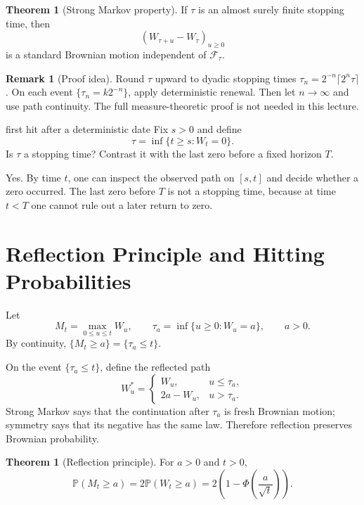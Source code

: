 \documentclass[10pt]{article}
\newcommand{\Pbb}{\mathbb P}
\newcommand{\1}{\mathbf 1}
\newcommand{\cF}{\mathcal F}
\theoremstyle{definition}
\newtheorem{theorem}[definition]{Theorem}
\newtheorem{remark}[definition]{Remark}
\begin{document}
\begin{theorem}[Strong Markov property]
If \(\tau\) is an almost surely finite stopping time, then
\[
(W_{\tau+u}-W_\tau)_{u\geq0}
\]
is a standard Brownian motion independent of \(\cF_\tau\).
\end{theorem}

\begin{remark}[Proof idea]
Round \(\tau\) upward to dyadic stopping times
\(\tau_n=2^{-n}\lceil2^n\tau\rceil\). On each event
\(\{\tau_n=k2^{-n}\}\), apply deterministic renewal. Then let
\(n\to\infty\) and use path continuity. The full measure-theoretic proof is
not needed in this lecture.
\end{remark}

\begin{studentexercise}{first hit after a deterministic date}
Fix \(s>0\) and define
\[
\tau=\inf\{t\geq s:W_t=0\}.
\]
Is \(\tau\) a stopping time? Contrast it with the last zero before a fixed
horizon \(T\).
\end{studentexercise}
\begin{shortsolution}
Yes. By time \(t\), one can inspect the observed path on \([s,t]\) and decide
whether a zero occurred. The last zero before \(T\) is not a stopping time,
because at time \(t<T\) one cannot rule out a later return to zero.
\end{shortsolution}

\section{Reflection Principle and Hitting Probabilities}

Let
\[
M_t=\max_{0\leq u\leq t}W_u,
\qquad
\tau_a=\inf\{u\geq0:W_u=a\},
\qquad a>0.
\]
By continuity, \(\{M_t\geq a\}=\{\tau_a\leq t\}\).

On the event \(\{\tau_a\leq t\}\), define the reflected path
\[
W_u^*=\begin{cases}
W_u,&u\leq\tau_a,\\
2a-W_u,&u>\tau_a.
\end{cases}
\]
Strong Markov says that the continuation after \(\tau_a\) is fresh Brownian
motion; symmetry says that its negative has the same law. Therefore reflection
preserves Brownian probability.

\begin{theorem}[Reflection principle]
For \(a>0\) and \(t>0\),
\[
\boxed{
\Pbb(M_t\geq a)=2\Pbb(W_t\geq a)
=2\left(1-\Phi\!\left(\frac{a}{\sqrt t}\right)\right).
}
\]
\end{theorem}
\end{document}
